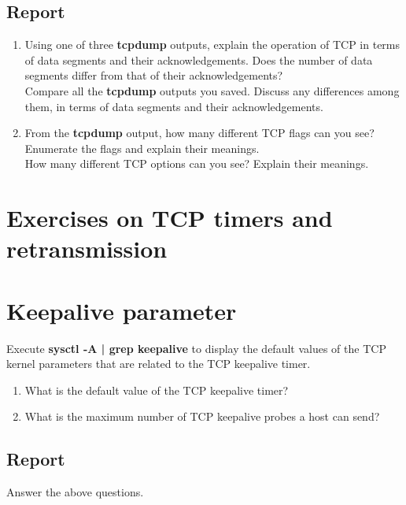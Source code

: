 \documentclass[10pt,a4paper]{article}
\numberwithin{equation}{section}
\numberwithin{figure}{section}
\numberwithin{table}{section}
\begin{document}
    \subsection*{Report}
    \begin{enumerate}
        \item Using one of three \textbf{tcpdump} outputs, explain the operation of TCP in terms of data segments and their acknowledgements. Does the number of data segments differ from that of their acknowledgements? \\
        Compare all the \textbf{tcpdump} outputs you saved.
        Discuss any differences among them, in terms of data segments and their acknowledgements.
        \item From the \textbf{tcpdump} output, how many different TCP flags can you see? Enumerate the flags and explain their meanings. \\
        How many different TCP options can you see?
        Explain their meanings.
    \end{enumerate}

\section*{Exercises on TCP timers and retransmission}
\section{Keepalive parameter}
    Execute \textbf{sysctl -A | grep keepalive} to display the default values of the TCP kernel parameters that are related to the TCP keepalive timer. \\
    \begin{enumerate}
        \item What is the default value of the TCP keepalive timer?
        \item What is the maximum number of TCP keepalive probes a host can send?
    \end{enumerate}
    \subsection*{Report}
    Answer the above questions.
\end{document}
